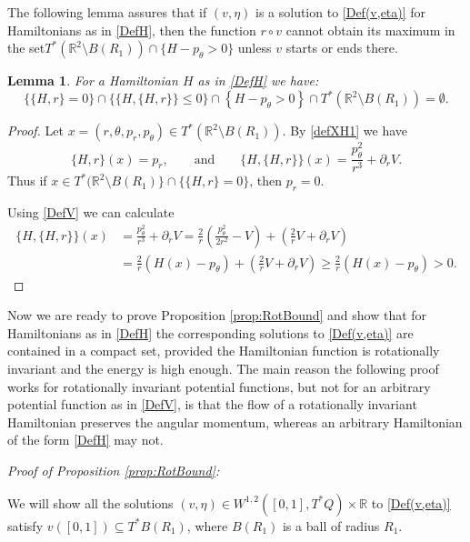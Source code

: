 \documentclass[a4paper]{amsart}
\newtheorem{lem}[thm]{Lemma}%
\numberwithin{equation}{section}
\newcommand{\R}{\mathbb{R}}
\begin{document}
The following lemma assures that if $(v,\eta)$ is a solution to \eqref{Def(v,eta)} for Hamiltonians as in \eqref{DefH}, then the function $r\circ v$ cannot obtain its maximum in the set\linebreak $T^*(\R^2\setminus B(R_1))\cap \{H-p_\theta>0\}$ unless $v$ starts or ends there.

\begin{lem}\label{lem:empty}
For a Hamiltonian $H$ as in \eqref{DefH} we have:
$$
\{\{H,r\}=0\}\cap \{\{H,\{H,r\}\}\leq 0\}\cap \left\lbrace H-p_\theta > 0\right\rbrace\cap T^*(\R^2\setminus B(R_1))=\emptyset.
$$
\end{lem}

\begin{proof}
Let $x=(r,\theta, p_r, p_\theta) \in T^*(\R^2\setminus B(R_1))$. By \eqref{defXH1} we have
$$
\{H,r\}(x) = p_r, \qquad \textrm{and}\qquad \{H, \{H, r\}\}(x)=\frac{p_\theta^2}{r^3}+\partial_rV.
$$
Thus if $x \in T^*(\R^2\setminus B(R_1)\}\cap \{\{H,r\}=0\}$, then $p_r=0$.

Using \eqref{DefV} we can calculate
\begin{align*}
\{H, \{H, r\}\}(x) & =\frac{p_\theta^2}{r^3}+\partial_rV  = \frac{2}{r}\left( \frac{p_\theta^2}{2r^2}- V\right)+\left( \frac{2}{r}V+ \partial_rV\right)\\
& = \frac{2}{r}(H(x)-p_\theta)+\left( \frac{2}{r}V+ \partial_rV\right) \geq \frac{2}{r}(H(x)-p_\theta)>0.
\end{align*}
\end{proof}

Now we are ready to prove Proposition \ref{prop:RotBound} and show that for Hamiltonians as in \eqref{DefH} the corresponding solutions to \eqref{Def(v,eta)} are contained in a compact set, provided the Hamiltonian function is rotationally invariant and the energy is high enough. The main reason the following proof works for rotationally invariant potential functions, but not for an arbitrary potential function as in \eqref{DefV}, is that the flow of a rotationally invariant Hamiltonian preserves the angular momentum, whereas an arbitrary Hamiltonian of the form \eqref{DefH} may not.

\vspace*{.5cm}
\noindent \textit{Proof of Proposition \ref{prop:RotBound}:}

We will show all the solutions $(v,\eta)\in W^{1,2}([0,1], T^*Q)\times\R$ to \eqref{Def(v,eta)} satisfy $v([0,1])\subseteq T^*B(R_1)$, where $B(R_1)$ is a ball of radius $R_1$. 
\end{document}
